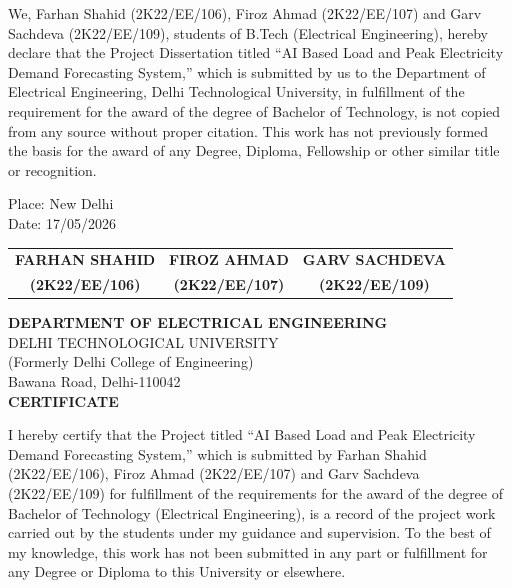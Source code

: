 \documentclass[12pt,a4paper,openany]{report}
\begin{document}
We, Farhan Shahid (2K22/EE/106), Firoz Ahmad (2K22/EE/107) and Garv Sachdeva (2K22/EE/109), students of B.Tech (Electrical Engineering), hereby declare that the Project Dissertation titled ``AI Based Load and Peak Electricity Demand Forecasting System,'' which is submitted by us to the Department of Electrical Engineering, Delhi Technological University, in fulfillment of the requirement for the award of the degree of Bachelor of Technology, is not copied from any source without proper citation. This work has not previously formed the basis for the award of any Degree, Diploma, Fellowship or other similar title or recognition.

\vspace{40pt}
\noindent\begin{minipage}[t]{0.22\textwidth}
Place: New Delhi\\[2pt]
Date: 17/05/2026
\end{minipage}\hfill
\begin{minipage}[t]{0.76\textwidth}
\centering
\begin{tabular}{ccc}
\textbf{FARHAN SHAHID} & \textbf{FIROZ AHMAD} & \textbf{GARV SACHDEVA} \\
\textbf{(2K22/EE/106)} & \textbf{(2K22/EE/107)} & \textbf{(2K22/EE/109)}
\end{tabular}
\end{minipage}

\newpage

\begin{center}
\textbf{DEPARTMENT OF ELECTRICAL ENGINEERING}\\[2pt]
DELHI TECHNOLOGICAL UNIVERSITY\\[2pt]
(Formerly Delhi College of Engineering)\\[2pt]
Bawana Road, Delhi-110042\\[14pt]
\textbf{CERTIFICATE}
\end{center}
\vspace{10pt}

I hereby certify that the Project titled ``AI Based Load and Peak Electricity Demand Forecasting System,'' which is submitted by Farhan Shahid (2K22/EE/106), Firoz Ahmad (2K22/EE/107) and Garv Sachdeva (2K22/EE/109) for fulfillment of the requirements for the award of the degree of Bachelor of Technology (Electrical Engineering), is a record of the project work carried out by the students under my guidance and supervision. To the best of my knowledge, this work has not been submitted in any part or fulfillment for any Degree or Diploma to this University or elsewhere.
\end{document}
